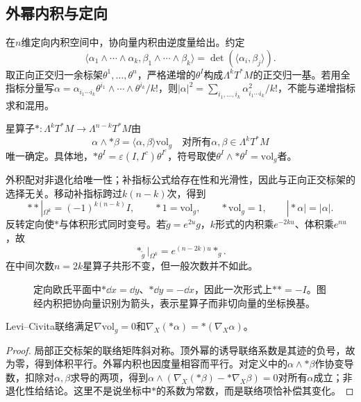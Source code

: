 \subsection*{外幂内积与定向}
在$n$维定向内积空间中，协向量内积由逆度量给出。约定
\[
 \langle\alpha_1\wedge\cdots\wedge\alpha_k,
 \beta_1\wedge\cdots\wedge\beta_k\rangle
 =\det(\langle\alpha_i,\beta_j\rangle).
\]
取正向正交归一余标架$\theta^1,\ldots,\theta^n$，严格递增的$\theta^I$构成$\Lambda^kT^*M$的正交归一基。若用全指标分量写$\alpha=\alpha_{i_1\cdots i_k}\theta^{i_1}\wedge\cdots\wedge\theta^{i_k}/k!$，则$|\alpha|^2=\sum_{i_1,\ldots,i_k}\alpha_{i_1\cdots i_k}^2/k!$，不能与递增指标求和混用。

\begin{definition}[Hodge星]\label{def:hodge-star}
星算子$*:\Lambda^kT^*M\to\Lambda^{n-k}T^*M$由
\[
 \alpha\wedge *\beta=\langle\alpha,\beta\rangle\mathrm{vol}_g
 \quad\text{对所有$\alpha,\beta\in\Lambda^kT^*M$}
\]
唯一确定。具体地，$*\theta^I=\varepsilon(I,I^c)\theta^{I^c}$，符号取使$\theta^I\wedge *\theta^I=\mathrm{vol}_g$者。
\end{definition}
外积配对非退化给唯一性；补指标公式给存在性和光滑性，因此与正向正交标架的选择无关。移动补指标跨过$k(n-k)$次，得到
\[
 **|_{\Omega^k}=(-1)^{k(n-k)}I,\qquad
 *1=\mathrm{vol}_g,\qquad *\mathrm{vol}_g=1,
 \qquad |*\alpha|=|\alpha|.
\]
反转定向使$*$与体积形式同时变号。若$\widetilde g=e^{2u}g$，$k$形式的内积乘$e^{-2ku}$、体积乘$e^{nu}$，故
\[
 *_{\widetilde g}|_{\Omega^k}=e^{(n-2k)u}*_g.
\]
在中间次数$n=2k$星算子共形不变，但一般次数并不如此。

\begin{figure}[htbp]
\centering
\caption{定向欧氏平面中$*\dd x=\dd y$、$*\dd y=-\dd x$，因此一次形式上$**=-I$。图经内积把协向量识别为箭头，表示星算子而非切向量的坐标换基。}
\label{fig:hodge-star-plane}
\end{figure}

\begin{proposition}\label{prop:parallel-hodge-star}
Levi--Civita联络满足$\nabla\mathrm{vol}_g=0$和$\nabla_X(*\alpha)=*(\nabla_X\alpha)$。
\end{proposition}
\begin{proof}
局部正交标架的联络矩阵斜对称。顶外幂的诱导联络系数是其迹的负号，故为零，得到体积平行。外幂内积也因度量相容而平行。对定义中的$\alpha\wedge *\beta$作协变导数，扣除对$\alpha,\beta$求导的两项，得到$\alpha\wedge(\nabla_X(*\beta)-*\nabla_X\beta)=0$对所有$\alpha$成立；非退化性给结论。这里不是说坐标中$*$的系数为常数，而是联络项恰补偿其变化。
\end{proof}

